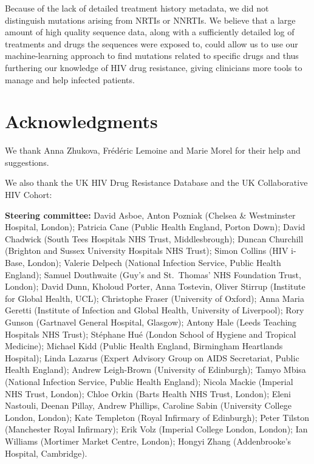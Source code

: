 \documentclass[
  11pt,
  twoside,
  BCOR=10mm,
  listof=totoc]{scrbook}
\begin{document}
Because of the lack of detailed treatment history metadata, we did not
distinguish mutations arising from NRTIs or NNRTIs. We believe that a
large amount of high quality sequence data, along with a sufficiently
detailed log of treatments and drugs the sequences were exposed to,
could allow us to use our machine-learning approach to find mutations
related to specific drugs and thus furthering our knowledge of HIV drug
resistance, giving clinicians more tools to manage and help infected
patients.

\hypertarget{hiv-acknowledgments}{%
\section*{Acknowledgments}\label{hiv-acknowledgments}}

We thank Anna Zhukova, Frédéric Lemoine and Marie Morel for their help
and suggestions.

We also thank the UK HIV Drug Resistance Database and the UK
Collaborative HIV Cohort:

\textbf{Steering committee:}
David Asboe, Anton Pozniak (Chelsea \& Westminster Hospital, London);
Patricia Cane (Public Health England, Porton Down); David Chadwick
(South Tees Hospitals NHS Trust, Middlesbrough); Duncan Churchill
(Brighton and Sussex University Hospitals NHS Trust); Simon Collins
(HIV i-Base, London); Valerie Delpech (National Infection Service,
Public Health England); Samuel Douthwaite (Guy's and St.~Thomas' NHS
Foundation Trust, London); David Dunn, Kholoud Porter, Anna
Tostevin, Oliver Stirrup (Institute for Global Health, UCL);
Christophe Fraser (University of Oxford); Anna Maria Geretti
(Institute of Infection and Global Health, University of Liverpool);
Rory Gunson (Gartnavel General Hospital, Glasgow); Antony Hale
(Leeds Teaching Hospitals NHS Trust); Stéphane Hué (London School of
Hygiene and Tropical Medicine); Michael Kidd (Public Health England,
Birmingham Heartlands Hospital); Linda Lazarus (Expert Advisory
Group on AIDS Secretariat, Public Health England); Andrew
Leigh-Brown (University of Edinburgh); Tamyo Mbisa (National
Infection Service, Public Health England); Nicola Mackie (Imperial
NHS Trust, London); Chloe Orkin (Barts Health NHS Trust, London);
Eleni Nastouli, Deenan Pillay, Andrew Phillips, Caroline Sabin
(University College London, London); Kate Templeton (Royal Infirmary
of Edinburgh); Peter Tilston (Manchester Royal Infirmary); Erik Volz
(Imperial College London, London); Ian Williams (Mortimer Market
Centre, London); Hongyi Zhang (Addenbrooke's Hospital, Cambridge).
\end{document}
